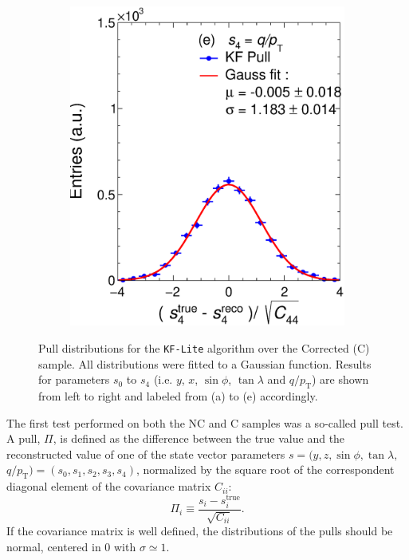 \begin{figure}[t]
\begin{subfigure}{0.32\textwidth}
         \includegraphics[width=\textwidth]{figures/ch4-KF_NDGArLite/Toy/Corr/UnitKFEnd_p4.eps}
         \caption{}
         \label{fig:resp4KF_GArLite_Corr}
     \end{subfigure}
        \caption[Pull distributions for the \texttt{KF-Lite} algorithm over the Corrected (C) sample.]{Pull distributions for the \texttt{KF-Lite} algorithm over the Corrected (C) sample. All distributions were fitted to a Gaussian function. Results for parameters $s_0$ to $s_4$ (i.e. $y$, $x$, $\sin\phi$, $\tan\lambda$ and $q/p_{\text{T}}$) are shown from left to right and labeled from (a) to (e) accordingly. }
        \label{fig:ToyUnitKF_GArLite_Corr}
\end{figure}

The first test performed on both the NC and C samples was a so-called pull test. A pull, $\Pi$, is defined as the difference between the true value and the reconstructed value of one of the state vector parameters $s=(y,z,\sin{\phi},\tan{\lambda},$ $ q/p_{\text{T}})=(s_0,s_1,s_2,s_3,s_4)$, normalized by the square root of the correspondent diagonal element of the covariance matrix $C_{ii}$:
\begin{equation}
\label{eq:Pull}
    \Pi_i\equiv\frac{s_i-s_i^{\text{true}}}{\sqrt{C_{ii}}}.
\end{equation}
If the covariance matrix is well defined, the distributions of the pulls should be normal, centered in 0  with $\sigma\simeq1$.

